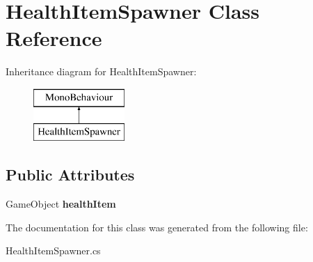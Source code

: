 \hypertarget{class_health_item_spawner}{}\section{Health\+Item\+Spawner Class Reference}
\label{class_health_item_spawner}
Inheritance diagram for Health\+Item\+Spawner\+:\begin{figure}[H]
\begin{center}
\leavevmode
\includegraphics[height=2.000000cm]{class_health_item_spawner}
\end{center}
\end{figure}
\subsection*{Public Attributes}
\begin{DoxyCompactItemize}
\item 
\mbox{\label{class_health_item_spawner_a4d41421ba0d81611bbeba19904cf6a96}} 
Game\+Object {\bfseries health\+Item}
\end{DoxyCompactItemize}


The documentation for this class was generated from the following file\+:\begin{DoxyCompactItemize}
\item 
Health\+Item\+Spawner.\+cs\end{DoxyCompactItemize}
